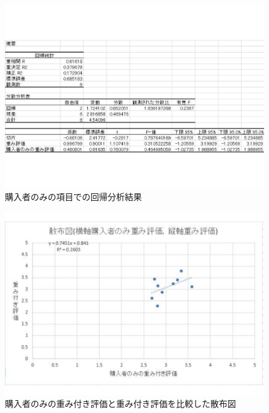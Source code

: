 \clearpage

\begin{figure}[htbp]

\centering
\includegraphics[width=12cm,clip]{reviewtoukei3.pdf}
\caption{購入者のみの項目での回帰分析結果}
\label{reviewtoukei3}

\end{figure}



\begin{figure}[htbp]

\centering
\includegraphics[width=12cm,clip]{sanpuzu2.pdf}
\caption{購入者のみの重み付き評価と重み付き評価を比較した散布図}
\label{sanpuzu2}

\end{figure}


\clearpage

